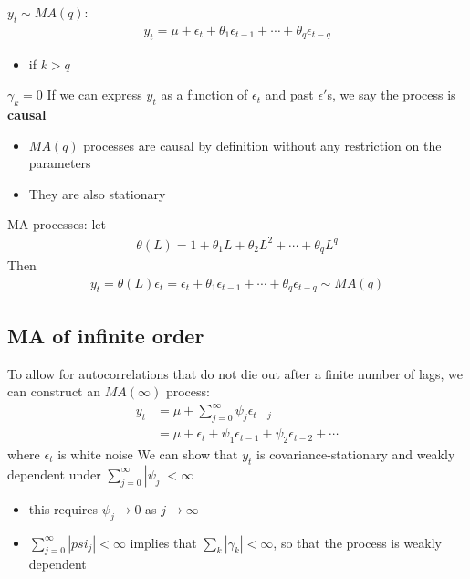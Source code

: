 \documentclass[a4paper,twoside,11pt]{article}
\begin{document}
\begin{shaded*}
\noindent \textbf{$y_t \sim MA(q):$}
\begin{equation*}
\begin{aligned}
y_t = \mu+\epsilon_t + \theta_1 \epsilon_{t-1}+\cdots + \theta_q \epsilon_{t-q}
\end{aligned}
\end{equation*}
\begin{itemize}
    \item if $k>q$
\end{itemize}
$\gamma_k =0$
\newline
If we can express $y_t$ as a function of $\epsilon_t$ and past $\epsilon'$s, we say the process is \textbf{causal}
\begin{itemize}
    \item $MA(q)$ processes are causal by definition without any restriction on the parameters
    \item They are also stationary
\end{itemize}
MA processes: let 
\begin{equation*}
\begin{aligned}
\theta(L) = 1+ \theta_1 L + \theta_2 L^2 + \cdots + \theta_q L^q
\end{aligned}
\end{equation*}
Then 
\begin{equation*}
\begin{aligned}
y_t = \theta(L) \epsilon_t = \epsilon_t + \theta_1 \epsilon_{t-1} + \cdots + \theta_q \epsilon_{t-q} \sim MA(q)
\end{aligned}
\end{equation*}
\end{shaded*}
\subsection{MA of infinite order}
\noindent To allow for autocorrelations that do not die out after a finite number of lags, we can construct an $MA(\infty)$ process:
\begin{equation*}
\begin{aligned}
y_t &= \mu + \sum^\infty_{j=0} \psi_j \epsilon_{t-j} \\ 
&= \mu + \epsilon_t + \psi_1 \epsilon_{t-1}+\psi_2 \epsilon_{t-2} + \cdots 
\end{aligned}
\end{equation*}
where $\epsilon_t$ is white noise
\newline
\newline
We can show that $y_t$ is covariance-stationary and weakly dependent under $\sum^{\infty}_{j=0} |\psi_j| < \infty$ 
\begin{itemize}
    \item this requires $\psi_j \rightarrow 0$ as $j \rightarrow \infty$
    \item $\sum^\infty_{j=0} |psi_j|<\infty$ implies that $\sum_k |\gamma_k| <\infty$, so that the process is weakly dependent
\end{itemize}
\end{document}
